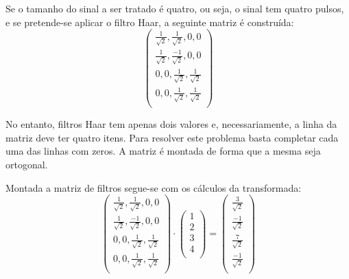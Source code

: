 			\par Se o tamanho do sinal a ser tratado é quatro, ou seja, o sinal tem quatro pulsos, e se pretende-se aplicar o filtro Haar, a seguinte matriz é construída:
			\begin{equation}
				\begin{pmatrix}
					\frac{1}{\sqrt{2}}, \frac{1}{\sqrt{2}}, 0, 0\\
					\frac{1}{\sqrt{2}}, \frac{-1}{\sqrt{2}}, 0, 0\\
					0, 0, \frac{1}{\sqrt{2}}, \frac{1}{\sqrt{2}}\\
					0, 0, \frac{1}{\sqrt{2}}, \frac{1}{\sqrt{2}}\\
					\label{eq:haarFilters}
				\end{pmatrix} 
			\end{equation}
			\par No entanto, filtros Haar tem apenas dois valores e, necessariamente, a linha da matriz deve ter quatro itens. Para resolver este problema basta completar cada uma das linhas com zeros. A matriz é montada de forma que a mesma seja ortogonal.

			\par Montada a matriz de filtros segue-se com os cálculos da transformada:
			\begin{equation}
				\begin{pmatrix}
					\frac{1}{\sqrt{2}}, \frac{1}{\sqrt{2}}, 0, 0\\
					\frac{1}{\sqrt{2}}, \frac{-1}{\sqrt{2}}, 0, 0\\
					0, 0, \frac{1}{\sqrt{2}}, \frac{1}{\sqrt{2}}\\
					0, 0, \frac{1}{\sqrt{2}}, \frac{1}{\sqrt{2}}\\
				\end{pmatrix} 
				\cdot
				\begin{pmatrix}
					1\\
					2\\
					3\\
					4\\
				\end{pmatrix} 
				=
				\begin{pmatrix}
					\frac{3}{\sqrt{2}}\\
					\frac{-1}{\sqrt{2}}\\
					\frac{7}{\sqrt{2}}\\
					\frac{-1}{\sqrt{2}}\\
				\end{pmatrix}
				\label{eq:haarMultiplic}
			\end{equation}
			
